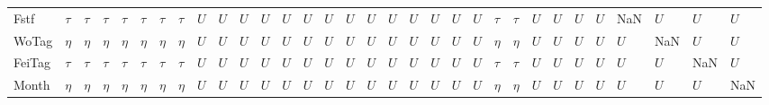 \begin{tabular}{llllllllllllllllllllllllllllllll}
Fstf   &    $\tau$ &    $\tau$ &    $\tau$ &    $\tau$ &    $\tau$ &    $\tau$ &    $\tau$ &     $U$ &     $U$ &     $U$ &     $U$ &     $U$ &     $U$ &     $U$ &     $U$ &     $U$ &     $U$ &     $U$ &       $U$ &     $U$ &     $U$ &    $\tau$ &    $\tau$ &     $U$ &     $U$ &     $U$ &     $U$ &     NaN &     $U$ &     $U$ &     $U$ \\
WoTag  &    $\eta$ &    $\eta$ &    $\eta$ &    $\eta$ &    $\eta$ &    $\eta$ &    $\eta$ &     $U$ &     $U$ &     $U$ &     $U$ &     $U$ &     $U$ &     $U$ &     $U$ &     $U$ &     $U$ &     $U$ &       $U$ &     $U$ &     $U$ &    $\eta$ &    $\eta$ &     $U$ &     $U$ &     $U$ &     $U$ &     $U$ &     NaN &     $U$ &     $U$ \\
FeiTag &    $\tau$ &    $\tau$ &    $\tau$ &    $\tau$ &    $\tau$ &    $\tau$ &    $\tau$ &     $U$ &     $U$ &     $U$ &     $U$ &     $U$ &     $U$ &     $U$ &     $U$ &     $U$ &     $U$ &     $U$ &       $U$ &     $U$ &     $U$ &    $\tau$ &    $\tau$ &     $U$ &     $U$ &     $U$ &     $U$ &     $U$ &     $U$ &     NaN &     $U$ \\
Month  &    $\eta$ &    $\eta$ &    $\eta$ &    $\eta$ &    $\eta$ &    $\eta$ &    $\eta$ &     $U$ &     $U$ &     $U$ &     $U$ &     $U$ &     $U$ &     $U$ &     $U$ &     $U$ &     $U$ &     $U$ &       $U$ &     $U$ &     $U$ &    $\eta$ &    $\eta$ &     $U$ &     $U$ &     $U$ &     $U$ &     $U$ &     $U$ &     $U$ &     NaN \\
\bottomrule
\end{tabular}
